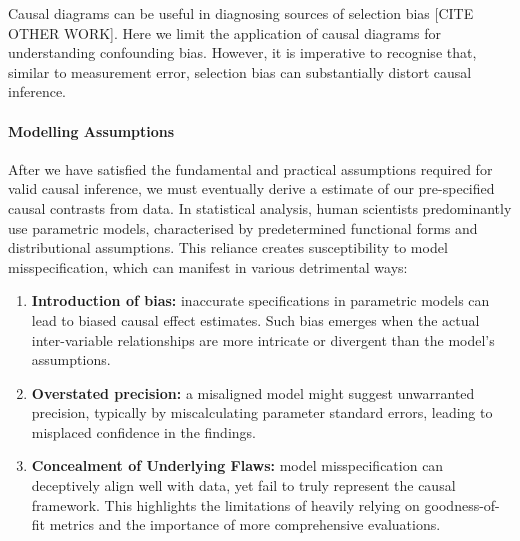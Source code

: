 \documentclass[
  singlecolumn,
  9pt]{article}
\let\oldparagraph\paragraph
\renewcommand{\paragraph}[1]{\oldparagraph{#1}\mbox{}}
\begin{document}
Causal diagrams can be useful in diagnosing sources of selection bias
{[}CITE OTHER WORK{]}. Here we limit the application of causal diagrams
for understanding confounding bias. However, it is imperative to
recognise that, similar to measurement error, selection bias can
substantially distort causal inference.

\paragraph{Modelling Assumptions}\label{modelling-assumptions}

After we have satisfied the fundamental and practical assumptions
required for valid causal inference, we must eventually derive a
estimate of our pre-specified causal contrasts from data. In statistical
analysis, human scientists predominantly use parametric models,
characterised by predetermined functional forms and distributional
assumptions. This reliance creates susceptibility to model
misspecification, which can manifest in various detrimental ways:

\begin{enumerate}
\def\labelenumi{\arabic{enumi}.}
\item
  \textbf{Introduction of bias:} inaccurate specifications in parametric
  models can lead to biased causal effect estimates. Such bias emerges
  when the actual inter-variable relationships are more intricate or
  divergent than the model's assumptions.
\item
  \textbf{Overstated precision:} a misaligned model might suggest
  unwarranted precision, typically by miscalculating parameter standard
  errors, leading to misplaced confidence in the findings.
\item
  \textbf{Concealment of Underlying Flaws:} model misspecification can
  deceptively align well with data, yet fail to truly represent the
  causal framework. This highlights the limitations of heavily relying
  on goodness-of-fit metrics and the importance of more comprehensive
  evaluations.
\end{enumerate}
\end{document}

